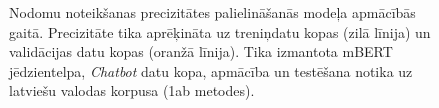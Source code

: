 \begin{figure}[h] 
   \centering
   \caption{Nodomu noteikšanas precizitātes palielināšanās modeļa apmācībās gaitā. Precizitāte tika aprēķināta uz treniņdatu kopas (zilā līnija) un validācijas datu kopas (oranžā līnija). Tika izmantota mBERT jēdzientelpa, \textit{Chatbot} datu kopa, apmācība un testēšana notika uz latviešu valodas korpusa (1ab metodes).} 
   \label{fig:chatbot-bert}
\end{figure}


